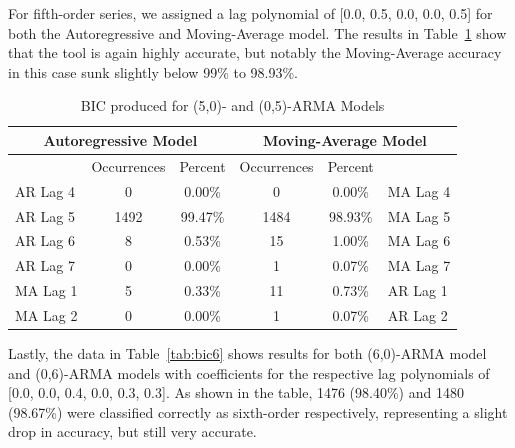 \documentclass[oneside,12pt,openany]{book}
\begin{document}
    \FloatBarrier
    
    For fifth-order series, we assigned a lag polynomial of [0.0, 0.5, 0.0, 0.0, 0.5] for both the Autoregressive and Moving-Average model. The results in Table~\ref{tab:bic5} show that the tool is again highly accurate, but notably the Moving-Average accuracy in this case sunk slightly below 99\% to 98.93\%.
    
    \begin{table}[hbt!]
        \centering
        \begin{tabular}{|l|c|c|c|c|l|}
            \hline
            \multicolumn{3}{|c|}{Autoregressive Model} & \multicolumn{3}{c|}{Moving-Average Model} \\ \hline
            \cellcolor{black} & Occurrences & Percent & Occurrences & Percent & \cellcolor{black} \\ \hline
            AR Lag 4 & 0 & 0.00\% & 0 & 0.00\% & MA Lag 4 \\ \hline
            AR Lag 5 & 1492 & 99.47\% & 1484 & 98.93\% & MA Lag 5 \\ \hline
            AR Lag 6 & 8 & 0.53\% & 15 & 1.00\% & MA Lag 6 \\ \hline
            AR Lag 7 & 0 & 0.00\% & 1 & 0.07\% & MA Lag 7 \\ \hline
            MA Lag 1 & 5 & 0.33\% & 11 & 0.73\% & AR Lag 1 \\ \hline
            MA Lag 2 & 0 & 0.00\% & 1 & 0.07\% & AR Lag 2 \\ \hline
        \end{tabular}
        \caption{BIC produced for (5,0)- and (0,5)-ARMA Models}
        \label{tab:bic5}
    \end{table}

    \FloatBarrier
    
    Lastly, the data in Table~\ref{tab:bic6} shows results for both (6,0)-ARMA model and (0,6)-ARMA models with coefficients for the respective lag polynomials of [0.0, 0.0, 0.4, 0.0, 0.3, 0.3]. As shown in the table, 1476 (98.40\%) and 1480 (98.67\%) were classified correctly as sixth-order respectively, representing a slight drop in accuracy, but still very accurate.
    
    \FloatBarrier
    
\end{document}
